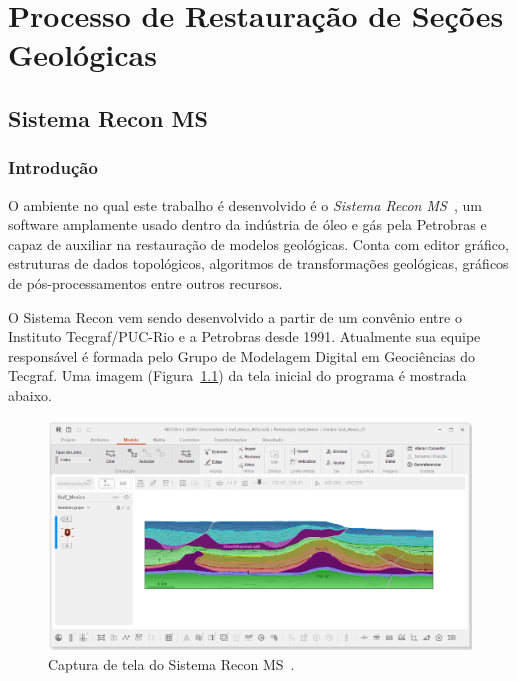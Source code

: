 
\chapter{Processo de Restauração de Seções Geológicas}

\section{Sistema Recon MS}

\subsection{Introdução}

O ambiente no qual este trabalho é desenvolvido é o \textit{Sistema Recon MS}~\cite{ReconTecgraf}, um software amplamente usado dentro da indústria de óleo e gás pela Petrobras e capaz de auxiliar na restauração de modelos geológicas. Conta com editor gráfico, estruturas de dados topológicos, algoritmos de transformações geológicas, gráficos de pós-processamentos entre outros recursos.

O Sistema Recon vem sendo desenvolvido a partir de um convênio entre o Instituto Tecgraf/PUC-Rio e a Petrobras desde 1991. Atualmente sua equipe responsável é formada pelo Grupo de Modelagem Digital em Geociências do Tecgraf. Uma imagem (Figura~\ref{fig-recon}) da tela inicial do programa é mostrada abaixo.

\begin{figure} [H]
  \begin{center}
    \includegraphics[width=\textwidth]{images/fig-recon}
    \caption{Captura de tela do Sistema Recon MS~\cite{Recon}.}\label{fig-recon}
  \end{center}
\end{figure}

